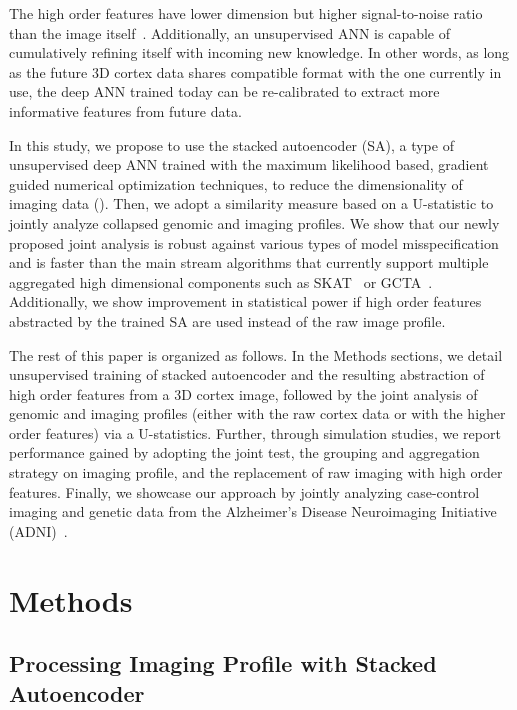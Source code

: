 \documentclass[11pt]{article}
\begin{document}
The high order features have lower dimension but higher signal-to-noise ratio than the image itself~\citep{DL:Intro1, DL:SDA1, DL:Intro2}. Additionally, an unsupervised ANN is capable of cumulatively refining itself with incoming new knowledge. In other words, as long as the future 3D cortex data shares compatible format with the one currently in use, the deep ANN trained today can be re-calibrated to extract more informative features from future data.

In this study, we propose to use the stacked autoencoder (SA), a type of unsupervised deep ANN trained with the maximum likelihood based, gradient guided numerical optimization techniques, to reduce the dimensionality of imaging data (\cite{DL:SDA1, DL:Intro2}). Then, we adopt a similarity measure based on a U-statistic \citep{UST1, UST2} to jointly analyze collapsed genomic and imaging profiles. We show that our newly proposed joint analysis is robust against various types of model misspecification and is faster than the main stream algorithms that currently support multiple aggregated high dimensional components such as SKAT~\citep{SKAT} or GCTA~\citep{GCTA}. Additionally, we show improvement in statistical power if high order features abstracted by the trained SA are used instead of the raw image profile.

The rest of this paper is organized as follows. In the Methods sections, we detail unsupervised training of stacked autoencoder and the resulting abstraction of high order features from a 3D cortex image, followed by the joint analysis of genomic and imaging profiles (either with the raw cortex data or with the higher order features) via a U-statistics. Further, through simulation studies, we report performance gained by adopting the joint test, the grouping and aggregation strategy on imaging profile, and the replacement of raw imaging with high order features.  Finally, we showcase our approach by jointly analyzing case-control imaging and genetic data from the Alzheimer’s Disease Neuroimaging Initiative (ADNI)~\citep{ADNI05, ADNI10}.

\section*{Methods}

\subsection*{Processing Imaging Profile with Stacked Autoencoder}
\end{document}
